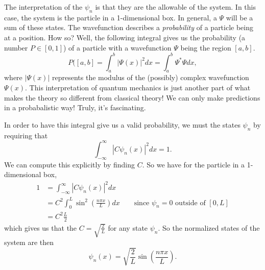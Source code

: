 The interpretation of the $\psi_n$ is that they are the allowable  of the system. In this case, the system is the particle in a 1-dimensional box. In general, a  $\Psi$ will be a sum of these states. The wavefunction describes a \emph{probability} of a particle being at a position.  How so? Well, the following integral gives us the probability (a number $P\in [0,1]$) of a particle with a wavefunction $\Psi$ being the region $[a,b]$.  
\[
P([a,b]=\int_a^b |\Psi(x)|^2 dx=\int_a^b \Psi^* \Psi dx,
\]
where $|\Psi(x) |$ represents the modulus of the (possibly) complex wavefunction $\Psi(x)$. This interpretation of quantum mechanics is just another part of what makes the theory so different from classical theory! We can only make predictions in a probabalistic way! Truly, it's fascinating.

In order to have this integral give us a valid probability, we must  the states $\psi_n$ by requiring that
\[
\int_{-\infty}^\infty |C\psi_n(x)|^2dx=1.
\]
We can compute this explicitly by finding $C$. So we have for the particle in a 1-dimensional box,
\begin{align*}
    1&= \int_{-\infty}^\infty |C\psi_n(x)|^2dx\\
    &= C^2\int_{0}^L \sin^2\left(\frac{n\pi x}{L}\right)dx \qquad \textrm{since $\psi_n=0$ outside of $[0,L]$}\\
    &= C^2 \frac{L}{2}
\end{align*}
which gives us that the  $C=\sqrt{\frac{2}{L}}$ for any state $\psi_n$. So the normalized states of the system are then
\[
\boxed{\psi_n(x) = \sqrt{\frac{2}{L}}\sin\left(\frac{n\pi x}{L}\right).}
\]

